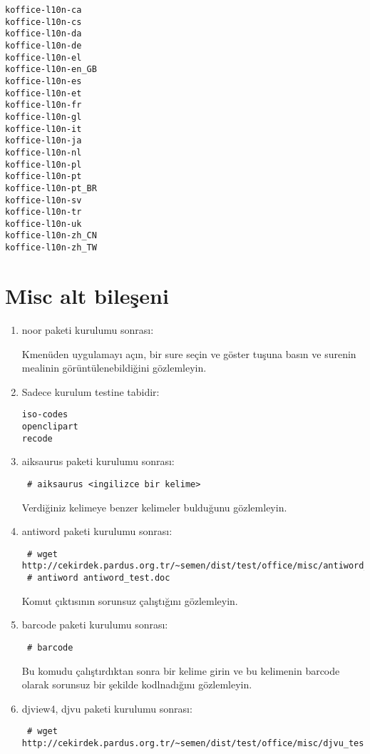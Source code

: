 \documentclass[a4paper,10pt]{article}
\begin{document}
\begin{verbatim}
koffice-l10n-ca
koffice-l10n-cs
koffice-l10n-da
koffice-l10n-de
koffice-l10n-el
koffice-l10n-en_GB
koffice-l10n-es
koffice-l10n-et
koffice-l10n-fr
koffice-l10n-gl
koffice-l10n-it
koffice-l10n-ja
koffice-l10n-nl
koffice-l10n-pl
koffice-l10n-pt
koffice-l10n-pt_BR
koffice-l10n-sv
koffice-l10n-tr
koffice-l10n-uk
koffice-l10n-zh_CN
koffice-l10n-zh_TW
\end{verbatim}

\section{Misc alt bileşeni}
\begin{enumerate}
\item noor paketi kurulumu sonrası:

Kmenüden uygulamayı açın, bir sure seçin ve göster tuşuna basın ve surenin mealinin görüntülenebildiğini gözlemleyin.
\item Sadece kurulum testine tabidir:
\begin{verbatim}
iso-codes
openclipart
recode

\end{verbatim}
\item aiksaurus paketi kurulumu sonrası:
\begin{verbatim}
 # aiksaurus <ingilizce bir kelime>
\end{verbatim}

Verdiğiniz kelimeye benzer kelimeler bulduğunu gözlemleyin.

\item antiword paketi kurulumu sonrası:
\begin{verbatim}
 # wget http://cekirdek.pardus.org.tr/~semen/dist/test/office/misc/antiword_test.doc
 # antiword antiword_test.doc
\end{verbatim}

Komut çıktısının sorunsuz çalıştığını gözlemleyin.

\item barcode paketi kurulumu sonrası:
\begin{verbatim}
 # barcode
\end{verbatim}
 Bu komudu çalıştırdıktan sonra bir kelime girin ve bu kelimenin barcode olarak sorunsuz bir şekilde kodlnadığını gözlemleyin.

\item djview4, djvu paketi kurulumu sonrası:
\begin{verbatim}
 # wget http://cekirdek.pardus.org.tr/~semen/dist/test/office/misc/djvu_test.djvu
\end{verbatim}


\end{enumerate}
\end{document}
